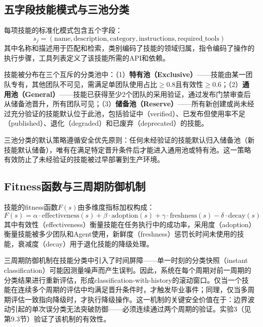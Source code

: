 \documentclass[12pt,a4paper]{ctexart}
\begin{document}
\subsection{五字段技能模式与三池分类}

每项技能的标准化模式包含五个字段：
\begin{equation}
s_j = (\text{name}, \text{description}, \text{category}, \text{instructions}, \text{required\_tools})
\label{eq:skill_schema}
\end{equation}
其中名称和描述用于匹配和检索，类别编码了技能的领域归属，指令编码了操作的执行步骤，工具列表定义了该技能所需的API和依赖。

技能被分布在三个互斥的分类池中：（1）\textbf{特有池（Exclusive）}——技能由某一团队专有，其他团队不可见，需满足单团队使用占比$\geq 0.8$且有效性$\geq 0.6$；（2）\textbf{通用池（General）}——技能已获得至少2个团队的采用验证，通过发布门禁审查后从储备池晋升，所有团队可见；（3）\textbf{储备池（Reserve）}——所有新创建或尚未经过充分验证的技能默认位于此池，包括验证中（verified）、已发布但使用率不足（published）、退化（degraded）和已废弃（deprecated）的技能。

三池分类的默认策略遵循安全优先原则：任何未经验证的技能默认归入储备池（新技能默认储备），唯有在满足特定晋升条件后才能进入通用池或特有池。这一策略有效防止了未经验证的技能被过早部署到生产环境。

\subsection{Fitness函数与三周期防御机制}

技能的fitness函数$F(s)$由多维度指标加权构成：
\begin{equation}
F(s) = \alpha \cdot \text{effectiveness}(s) + \beta \cdot \text{adoption}(s) + \gamma \cdot \text{freshness}(s) - \delta \cdot \text{decay}(s)
\label{eq:fitness}
\end{equation}
其中有效性（effectiveness）衡量技能在任务执行中的成功率，采用度（adoption）衡量技能被多少团队和Agent使用，新鲜度（freshness）惩罚长时间未使用的技能，衰减度（decay）用于退化技能的降级处理。

三周期防御机制在技能分类中引入了时间屏障——单一时刻的分类快照（instant classification）可能因测量噪声而产生误判。因此，系统在每个周期对前一周期的分类结果进行重新评估，形成classification-with-history的滚动窗口。仅当一个技能在连续多个周期的评估中均满足晋升条件时，才触发毕业事件；同理，仅当多周期评估一致指向降级时，才执行降级操作。这一机制的关键安全价值在于：边界波动引起的单次误分类无法突破防御——必须连续通过两个周期的验证。实验3（见第9.3节）验证了该机制的有效性。
\end{document}
